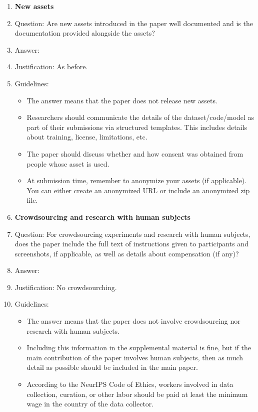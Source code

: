 \documentclass{article}
\numberwithin{theorem}{section}
\theoremstyle{definition}
\begin{document}
\begin{enumerate}
\item {\bf New assets}
    \item[] Question: Are new assets introduced in the paper well documented and is the documentation provided alongside the assets?
    \item[] Answer: \answerNA{} %
    \item[] Justification: As before.
    \item[] Guidelines:
    \begin{itemize}
        \item The answer \answerNA{} means that the paper does not release new assets.
        \item Researchers should communicate the details of the dataset\slash code\slash model as part of their submissions via structured templates. This includes details about training, license, limitations, etc. 
        \item The paper should discuss whether and how consent was obtained from people whose asset is used.
        \item At submission time, remember to anonymize your assets (if applicable). You can either create an anonymized URL or include an anonymized zip file.
    \end{itemize}

\item {\bf Crowdsourcing and research with human subjects}
    \item[] Question: For crowdsourcing experiments and research with human subjects, does the paper include the full text of instructions given to participants and screenshots, if applicable, as well as details about compensation (if any)? 
    \item[] Answer: \answerNA{} %
    \item[] Justification: No crowdsourching.
    \item[] Guidelines:
    \begin{itemize}
        \item The answer \answerNA{} means that the paper does not involve crowdsourcing nor research with human subjects.
        \item Including this information in the supplemental material is fine, but if the main contribution of the paper involves human subjects, then as much detail as possible should be included in the main paper. 
        \item According to the NeurIPS Code of Ethics, workers involved in data collection, curation, or other labor should be paid at least the minimum wage in the country of the data collector. 
    \end{itemize}


\end{enumerate}
\end{document}
